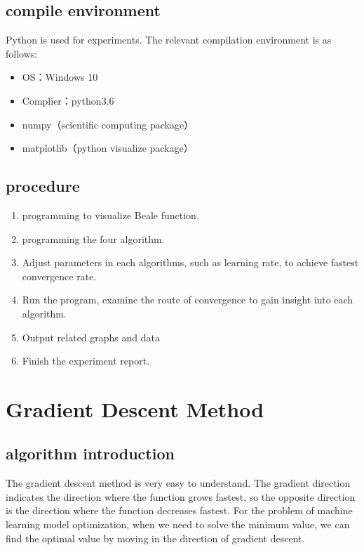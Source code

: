 \documentclass[aps,letterpaper,10pt]{article}
\begin{document}
\subsection{compile environment}
Python is used for experiments. The relevant compilation environment is as follows:
	\begin{itemize}
		\item OS：Windows 10
		\item Complier：python3.6
		\item numpy（scientific computing package）
		\item matplotlib（python visualize package）
	\end{itemize}

\subsection{procedure}

	\begin{enumerate}
		\item programming to visualize Beale function.
		\item programming the four algorithm.
		\item Adjust parameters in each algorithms, such as learning rate, to achieve fastest convergence rate.
		\item Run the program, examine the route of convergence to gain insight into each algorithm.
		\item Output related graphs and data
		\item Finish the experiment report.
	\end{enumerate}


\newpage
\section{Gradient Descent Method}
\subsection{algorithm introduction}
The gradient descent method is very easy to understand. The gradient direction indicates the direction where the function grows fastest, so the opposite direction is the direction where the function decreases fastest. For the problem of machine learning model optimization, when we need to solve the minimum value, we can find the optimal value by moving in the direction of gradient descent.\vspace{3mm}
\end{document}
